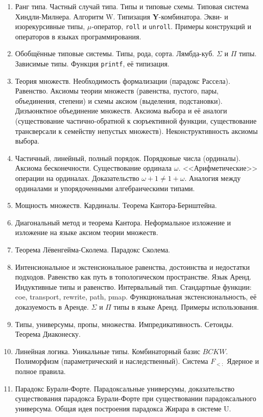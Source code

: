 \documentclass[11pt,a4paper,oneside]{article}
\begin{document}
\begin{enumerate}
\item Ранг типа. Частный случай типа. Типы и типовые схемы. Типовая система Хиндли-Милнера. Алгоритм W.
Типизация \textbf{Y}-комбинатора. Экви- и изорекурсивные типы, $\mu$-оператор, \texttt{roll} и \texttt{unroll}.
Примеры конструкций и операторов в языках программирования.
\item Обобщённые типовые системы. Типы, рода, сорта. Лямбда-куб. $\Sigma$ и $\Pi$ типы.
Зависимые типы. Функция \verb!printf!, её типизация.
\item Теория множеств. Необходимость формализации (парадокс Рассела). Равенство. Аксиомы теории множеств 
(равенства, пустого, пары, объединения, степени) и схемы аксиом (выделения, подстановки). Дизъюнктное объединение множеств.
Аксиома выбора и её аналоги (существование частично-обратной к сюръективной функции, существование трансверсали к семейству
непустых множеств). Неконструктивность аксиомы выбора.
\item Частичный, линейный, полный порядок. Порядковые числа (ординалы). Аксиома бесконечности. Существование ординала $\omega$. 
<<Арифметические>> операции на ординалах. Доказательство $\omega+1 \ne 1+\omega$. 
Аналогия между ординалами и упорядоченными алгебраическими типами.
\item Мощность множеств. Кардиналы. Теорема Кантора-Бернштейна. 
\item Диагональный метод и теорема Кантора. Неформальное изложение и изложение на языке аксиом теории множеств.
\item Теорема Лёвенгейма-Сколема. Парадокс Сколема.
\item Интенсиональное и экстенсиональное равенства, достоинства и недостатки подходов.
Равенство как путь в топологическом пространстве. Язык Аренд. Индуктивные типы и равенство. Интервальный тип. 
Стандартные функции: coe, transport, rewrite, path, pmap. 
Функциональная экстенсиональность, её доказуемость в Аренде. $\Sigma$ и $\Pi$ типы в языке Аренд. Примеры использования.
\item Типы, универсумы, пропы, множества. Импредикативность. Сетоиды. Теорема Диаконеску. 
\item Линейная логика. Уникальные типы. Комбинаторный базис $BCKW$.
Полиморфизм (параметрический и наследственный). Система $F_{<:}$ Ядерное и полное правила.
\item Парадокс Бурали-Форте. Парадоксальные универсумы, доказательство существования парадокса Бурали-Форте при 
существовании парадоксального универсума. Общая идея построения парадокса Жирара в системе U.
\end{enumerate}
\end{document}
